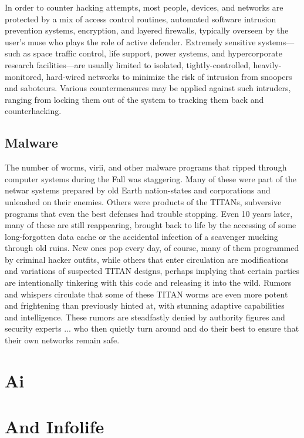 In order to counter hacking attempts, most people, 
devices, and networks are protected by a mix of 
access control routines, automated software intrusion
prevention systems, encryption, and layered
firewalls, typically overseen by the user's muse who 
plays the role of active defender. Extremely sensitive 
systems—such as space traffic control, life support, 
power systems, and hypercorporate research facilities—are
usually limited to isolated, tightly-controlled,
heavily-monitored, hard-wired networks to minimize 
the risk of intrusion from snoopers and saboteurs. 
Various countermeasures may be applied against 
such intruders, ranging from locking them out of the 
system to tracking them back and counterhacking.

\subsection{Malware}

The number of worms, virii, and other malware programs
that ripped through computer systems during
the Fall was staggering. Many of these were part of 
the netwar systems prepared by old Earth nation-states 
and corporations and unleashed on their enemies. 
Others were products of the TITANs, subversive programs
that even the best defenses had trouble stopping.
Even 10 years later, many of these are still reappearing, 
brought back to life by the accessing of some long-forgotten
data cache or the accidental infection of a
scavenger mucking through old ruins. New ones pop 
every day, of course, many of them programmed by 
criminal hacker outfits, while others that enter circulation
are modifications and variations of suspected
TITAN designs, perhaps implying that certain parties 
are intentionally tinkering with this code and releasing 
it into the wild. Rumors and whispers circulate that 
some of these TITAN worms are even more potent and 
frightening than previously hinted at, with stunning 
adaptive capabilities and intelligence. These rumors 
are steadfastly denied by authority figures and security 
experts ... who then quietly turn around and do their 
best to ensure that their own networks remain safe.

\section{Ai}


\section{ And Infolife}

